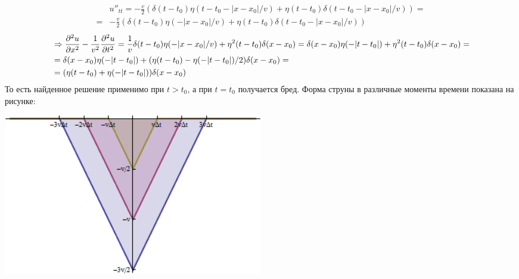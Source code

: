 \[
\begin{aligned}
& u''_{tt} = -\frac{v}{2} (\delta(t - t_0) \eta(t - t_0 - |x - x_0|/v) + \eta(t - t_0) \delta(t - t_0 - |x - x_0|/v)) = 
\\ =
&-\frac{v}{2} (\delta(t - t_0) \eta(- |x - x_0|/v) + \eta(t - t_0) \delta(t - t_0 - |x - x_0|/v)) 
\end{aligned}
\]
\[
\begin{aligned}
& \Rightarrow
\frac{\partial^2 u}{\partial x^2} - \frac{1}{v^2} \frac{\partial^2 u}{\partial t^2} = \frac{1}{v}\delta(t - t_0) \eta(- |x - x_0|/v) + \eta^2(t - t_0) \delta(x - x_0) =
\delta(x -x_0)\eta(-|t -t_0|) + \eta^2(t - t_0) \delta(x - x_0) = \\
& =
\delta(x -x_0)\eta(-|t -t_0|) + (\eta(t - t_0) - \eta(-|t - t_0|)/2) \delta(x - x_0) = \\
& = (\eta(t - t_0) + \eta(-|t -t_0|)) \delta(x - x_0)
\end{aligned}
\]
То есть найденное решение применимо при $t > t_0$, а при $t = t_0$ получается бред. Форма струны в различные моменты времени показана на рисунке:
\begin{center}
	\includegraphics[width=0.5\textwidth]{images/png/for_deltac_force.png}
\end{center}

